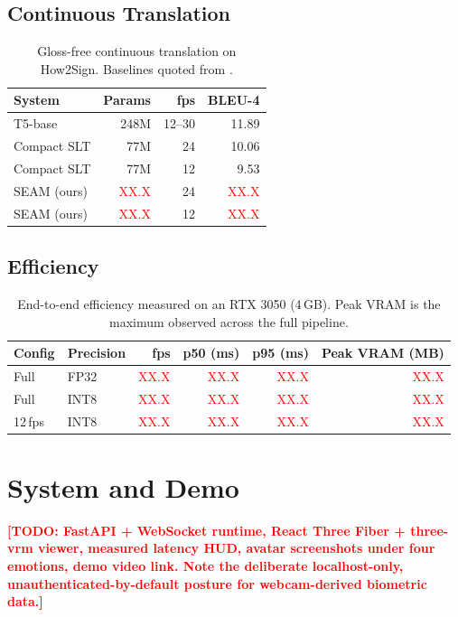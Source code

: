 \documentclass[conference]{IEEEtran}
\newcommand{\TODO}[1]{\textcolor{red}{\textbf{[TODO: #1]}}}
\newcommand{\NUM}{\textcolor{red}{XX.X}}
\begin{document}
\subsection{Continuous Translation}
\begin{table}[t]
\caption{Gloss-free continuous translation on How2Sign. Baselines quoted from
\cite{chen2026compactslt,uthus2023youtubeasl}.}
\label{tab:slt}
\centering
\small
\begin{tabular}{@{}lrrr@{}}
\toprule
System & Params & fps & BLEU-4 \\
\midrule
T5-base \cite{uthus2023youtubeasl}       & 248M & 12--30 & 11.89 \\
Compact SLT \cite{chen2026compactslt}    & 77M  & 24 & 10.06 \\
Compact SLT \cite{chen2026compactslt}    & 77M  & 12 & 9.53 \\
SEAM (ours)                              & \NUM & 24 & \NUM \\
SEAM (ours)                              & \NUM & 12 & \NUM \\
\bottomrule
\end{tabular}
\end{table}

\subsection{Efficiency}
\begin{table}[t]
\caption{End-to-end efficiency measured on an RTX 3050 (4\,GB). Peak VRAM is the maximum observed
across the full pipeline.}
\label{tab:efficiency}
\centering
\small
\begin{tabular}{@{}llrrrr@{}}
\toprule
Config & Precision & fps & p50 (ms) & p95 (ms) & Peak VRAM (MB) \\
\midrule
Full        & FP32 & \NUM & \NUM & \NUM & \NUM \\
Full        & INT8 & \NUM & \NUM & \NUM & \NUM \\
12\,fps     & INT8 & \NUM & \NUM & \NUM & \NUM \\
\bottomrule
\end{tabular}
\end{table}

\section{System and Demo}
\label{sec:system}
\TODO{FastAPI + WebSocket runtime, React Three Fiber + three-vrm viewer, measured latency HUD,
avatar screenshots under four emotions, demo video link. Note the deliberate localhost-only,
unauthenticated-by-default posture for webcam-derived biometric data.}
\end{document}
